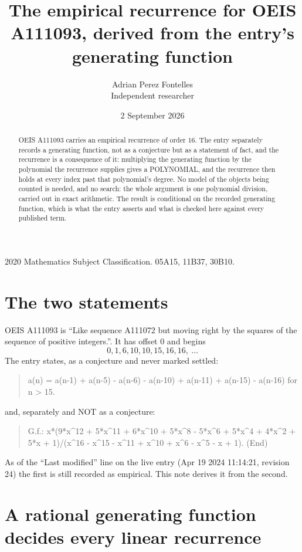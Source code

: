 \documentclass[11pt,a4paper]{article}
\title{The empirical recurrence for OEIS A111093, derived from the entry's generating function}
\author{Adrian Perez Fontelles\\ \small Independent researcher}
\date{2 September 2026}
\theoremstyle{plain}
\theoremstyle{definition}
\begin{document}
\maketitle

\begin{abstract}
OEIS A111093 carries an empirical recurrence of order $16$. The entry separately records a
generating function, not as a conjecture but as a statement of fact, and the recurrence is a
consequence of it: multiplying the generating function by the polynomial the recurrence
supplies gives a POLYNOMIAL, and the recurrence then holds at every index past that
polynomial's degree. No model of the objects being counted is needed, and no search: the
whole argument is one polynomial division, carried out in exact arithmetic. The result is
conditional on the recorded generating function, which is what the entry asserts and what is
checked here against every published term.
\end{abstract}

\noindent\small 2020 Mathematics Subject Classification. 05A15, 11B37, 30B10.\normalsize

\section{The two statements}

OEIS A111093 is ``Like sequence A111072 but moving right by the squares of the sequence of positive integers.''. It has offset $0$ and begins
\[
0, 1, 6, 10, 10, 15, 16, 16,\ \dots
\]
The entry states, as a conjecture and never marked settled:
\begin{quote}
a(n) = a(n-1) + a(n-5) - a(n-6) - a(n-10) + a(n-11) + a(n-15) - a(n-16) for n > 15.
\end{quote}
and, separately and NOT as a conjecture:
\begin{quote}
G.f.: x*(9*x\^{}12 + 5*x\^{}11 + 6*x\^{}10 + 5*x\^{}8 - 5*x\^{}6 + 5*x\^{}4 + 4*x\^{}2 + 5*x + 1)/(x\^{}16 - x\^{}15 - x\^{}11 + x\^{}10 + x\^{}6 - x\^{}5 - x + 1). (End)
\end{quote}
As of the ``Last modified'' line on the live entry (Apr 19 2024 11:14:21, revision 24) the first is still
recorded as empirical. This note derives it from the second.

\section{A rational generating function decides every linear recurrence}
\end{document}
